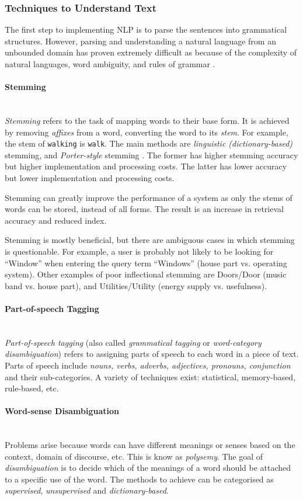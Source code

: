 \documentclass[12pt,a4paper]{article}
\newcommand{\myparagraph}[1]{\paragraph{#1}\mbox{}\\}
\begin{document}
\subsubsection{Techniques to Understand Text}
The first step to implementing NLP is to parse the sentences into grammatical structures. However, parsing and understanding a natural language from an unbounded domain has proven extremely difficult as because of the complexity of natural languages, word ambiguity, and rules of grammar \cite{Martinez2010}.

\myparagraph{Stemming}
\textit{Stemming} refers to the task of mapping words to their base form. It is achieved by removing \textit{affixes} from a word, converting the word to its \textit{stem}. For example, the stem of \texttt{walking} is \texttt{walk}. The main methods are \textit{linguistic (dictionary-based)} stemming, and \textit{Porter-style} stemming \cite{Porter1980}. The former has higher stemming accuracy but higher implementation and processing costs. The latter has lower accuracy but lower implementation and processing costs.

Stemming can greatly improve the performance of a system as only the stems of words can be stored, instead of all forms. The result is an increase in retrieval accuracy and reduced index.

Stemming is mostly beneficial, but there are ambiguous cases in which stemming is questionable. For example, a user is probably not likely to be looking for “Window” when entering the query term “Windows” (house part vs. operating system). Other examples
of poor inflectional stemming are Doors/Door (music band vs. house part), and Utilities/Utility (energy supply vs. usefulness).

\myparagraph{Part-of-speech Tagging}
\textit{Part-of-speech tagging} (also called \textit{grammatical tagging} or \textit{word-category disambiguation}) refers to assigning parts of speech to each word in a piece of text. Parts of speech include \textit{nouns, verbs, adverbs, adjectives, pronouns, conjunction} and their sub-categories. A variety of techniques exist: statistical, memory-based, rule-based, etc.

\myparagraph{Word-sense Disambiguation}
Problems arise because words can have different meanings or senses based on the context, domain of discourse, etc. This is know as \textit{polysemy}. The goal of \textit{disambiguation} is to decide which of the meanings of a word should be attached to a specific use of the word. The methods to achieve can be categorised as \textit{supervised}, \textit{unsupervised} and \textit{dictionary-based}.
\end{document}

